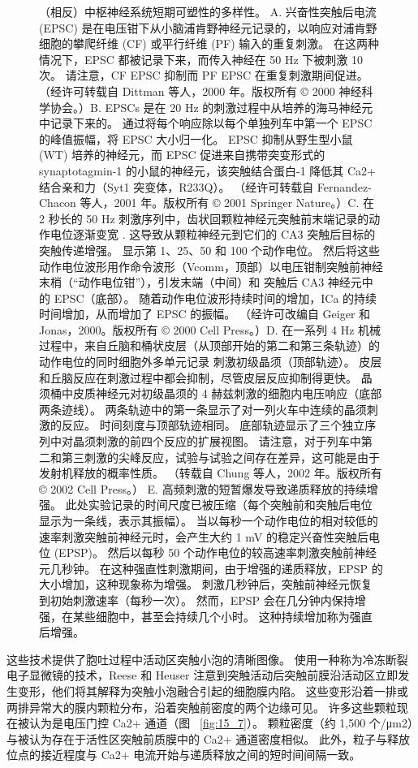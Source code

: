 \begin{figure}[htbp]
	\caption{（相反）中枢神经系统短期可塑性的多样性。 A. 兴奋性突触后电流 (EPSC) 是在电压钳下从小脑浦肯野神经元记录的，以响应对浦肯野细胞的攀爬纤维 (CF) 或平行纤维 (PF) 输入的重复刺激。 在这两种情况下，EPSC 都被记录下来，而传入神经在 50 Hz 下被刺激 10 次。 请注意，CF EPSC 抑制而 PF EPSC 在重复刺激期间促进。 （经许可转载自 Dittman 等人，2000 年。版权所有 © 2000 神经科学协会。）B. EPSCs 是在 20 Hz 的刺激过程中从培养的海马神经元中记录下来的。 通过将每个响应除以每个单独列车中第一个 EPSC 的峰值振幅，将 EPSC 大小归一化。 EPSC 抑制从野生型小鼠 (WT) 培养的神经元，而 EPSC 促进来自携带突变形式的 synaptotagmin-1 的小鼠的神经元，该突触结合蛋白-1 降低其 Ca2+ 结合亲和力（Syt1 突变体，R233Q）。 （经许可转载自 Fernandez-Chacon 等人，2001 年。版权所有 © 2001 Springer Nature。）C. 在 2 秒长的 50 Hz 刺激序列中，齿状回颗粒神经元突触前末端记录的动作电位逐渐变宽 . 这导致从颗粒神经元到它们的 CA3 突触后目标的突触传递增强。 显示第 1、25、50 和 100 个动作电位。 然后将这些动作电位波形用作命令波形（Vcomm，顶部）以电压钳制突触前神经末梢（“动作电位钳”），引发末端（中间）和 突触后 CA3 神经元中的 EPSC（底部）。 随着动作电位波形持续时间的增加，ICa 的持续时间增加，从而增加了 EPSC 的振幅。 （经许可改编自 Geiger 和 Jonas，2000。版权所有 © 2000 Cell Press。）D. 在一系列 4 Hz 机械过程中，来自丘脑和桶状皮层（从顶部开始的第二和第三条轨迹）的动作电位的同时细胞外多单元记录 刺激初级晶须（顶部轨迹）。 皮层和丘脑反应在刺激过程中都会抑制，尽管皮层反应抑制得更快。 晶须桶中皮质神经元对初级晶须的 4 赫兹刺激的细胞内电压响应（底部两条迹线）。 两条轨迹中的第一条显示了对一列火车中连续的晶须刺激的反应。 时间刻度与顶部轨迹相同。 底部轨迹显示了三个独立序列中对晶须刺激的前四个反应的扩展视图。 请注意，对于列车中第二和第三刺激的尖峰反应，试验与试验之间存在差异，这可能是由于发射机释放的概率性质。 （转载自 Chung 等人，2002 年。版权所有 © 2002 Cell Press。） E. 高频刺激的短暂爆发导致递质释放的持续增强。 此处实验记录的时间尺度已被压缩（每个突触前和突触后电位显示为一条线，表示其振幅）。 当以每秒一个动作电位的相对较低的速率刺激突触前神经元时，会产生大约 1 mV 的稳定兴奋性突触后电位 (EPSP)。 然后以每秒 50 个动作电位的较高速率刺激突触前神经元几秒钟。 在这种强直性刺激期间，由于增强的递质释放，EPSP 的大小增加，这种现象称为增强。 刺激几秒钟后，突触前神经元恢复到初始刺激速率（每秒一次）。 然而，EPSP 会在几分钟内保持增强，在某些细胞中，甚至会持续几个小时。 这种持续增加称为强直后增强。}
	\label{fig:15_15}
\end{figure}


这些技术提供了胞吐过程中活动区突触小泡的清晰图像。 
使用一种称为冷冻断裂电子显微镜的技术，Reese 和 Heuser 注意到突触活动后突触前膜沿活动区立即发生变形，他们将其解释为突触小泡融合引起的细胞膜内陷。 
这些变形沿着一排或两排异常大的膜内颗粒分布，沿着突触前密度的两个边缘可见。
许多这些颗粒现在被认为是电压门控 Ca2+ 通道（图 ~\ref{fig:15_7}）。
颗粒密度（约 1,500 个/μm2）与被认为存在于活性区突触前质膜中的 Ca2+ 通道密度相似。
此外，粒子与释放位点的接近程度与 Ca2+ 电流开始与递质释放之间的短时间间隔一致。


